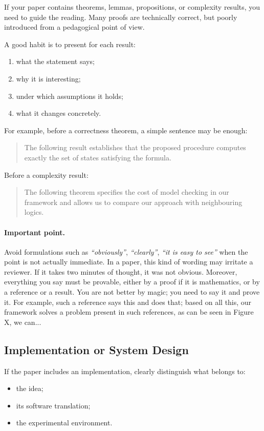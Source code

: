 \documentclass[11pt,a4paper]{article}
\theoremstyle{definition}
\begin{document}
If your paper contains theorems, lemmas, propositions, or complexity results, you need to guide the reading. Many proofs are technically correct, but poorly introduced from a pedagogical point of view.

A good habit is to present for each result:
\begin{enumerate}[label=\arabic*.]
    \item what the statement says;
    \item why it is interesting;
    \item under which assumptions it holds;
    \item what it changes concretely.
\end{enumerate}

For example, before a correctness theorem, a simple sentence may be enough:
\begin{quote}
The following result establishes that the proposed procedure computes exactly the set of states satisfying the formula.
\end{quote}

Before a complexity result:
\begin{quote}
The following theorem specifies the cost of model checking in our framework and allows us to compare our approach with neighbouring logics.
\end{quote}

\paragraph{Important point.}
Avoid formulations such as \textit{``obviously''}, \textit{``clearly''}, \textit{``it is easy to see''} when the point is not actually immediate. In a paper, this kind of wording may irritate a reviewer. If it takes two minutes of thought, it was not obvious. Moreover, everything you say must be provable, either by a proof if it is mathematics, or by a reference or a result. You are not better by magic; you need to say it and prove it. For example, such a reference says this and does that; based on all this, our framework solves a problem present in such references, as can be seen in Figure X, we can...

\subsection*{Implementation or System Design}

If the paper includes an implementation, clearly distinguish what belongs to:
\begin{itemize}
    \item the idea;
    \item its software translation;
    \item the experimental environment.
\end{itemize}
\end{document}
